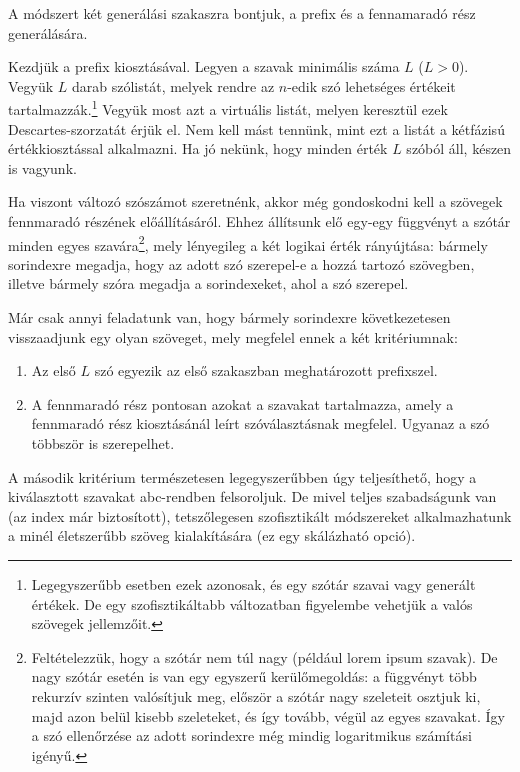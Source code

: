 \documentclass[
    parspace, %
    noindent, %
]{elteiktdk}[2023/04/10]
\begin{document}
A módszert két generálási szakaszra bontjuk, a prefix és a fennamaradó rész generálására.

Kezdjük a prefix kiosztásával.
Legyen a szavak minimális száma $L$ ($L > 0$).
Vegyük $L$ darab szólistát, melyek rendre az $n$-edik szó lehetséges értékeit tartalmazzák.\footnote{
  Legegyszerűbb esetben ezek azonosak, és egy szótár szavai vagy generált értékek.
  De egy szofisztikáltabb változatban figyelembe vehetjük a valós szövegek jellemzőit.
}
Vegyük most azt a virtuális listát, melyen keresztül ezek Descartes-szorzatát érjük el.
Nem kell mást tennünk, mint ezt a listát a kétfázisú értékkiosztással alkalmazni.
Ha jó nekünk, hogy minden érték $L$ szóból áll, készen is vagyunk.

Ha viszont változó szószámot szeretnénk,
akkor még gondoskodni kell a szövegek fennmaradó részének előállításáról.
Ehhez állítsunk elő egy-egy függvényt a szótár minden egyes szavára\footnote{
  Feltételezzük, hogy a szótár nem túl nagy (például lorem ipsum szavak).
  De nagy szótár esetén is van egy egyszerű kerülőmegoldás:
  a függvényt több rekurzív szinten valósítjuk meg,
  először a szótár nagy szeleteit osztjuk ki,
  majd azon belül kisebb szeleteket, és így tovább, végül az egyes szavakat.
  Így a szó ellenőrzése az adott sorindexre még mindig logaritmikus számítási igényű.
}, mely lényegileg a két logikai érték rányújtása:
bármely sorindexre megadja, hogy az adott szó szerepel-e a hozzá tartozó szövegben,
illetve bármely szóra megadja a sorindexeket, ahol a szó szerepel.

Már csak annyi feladatunk van, hogy bármely sorindexre következetesen visszaadjunk egy olyan szöveget,
mely megfelel ennek a két kritériumnak:

\begin{enumerate}
  \item Az első $L$ szó egyezik az első szakaszban meghatározott prefixszel.
  \item A fennmaradó rész pontosan azokat a szavakat tartalmazza,
        amely a fennmaradó rész kiosztásánál leírt szóválasztásnak megfelel.
        Ugyanaz a szó többször is szerepelhet.
\end{enumerate}

A második kritérium természetesen legegyszerűbben úgy teljesíthető,
hogy a kiválasztott szavakat abc-rendben felsoroljuk.
De mivel teljes szabadságunk van (az index már biztosított),
tetszőlegesen szofisztikált módszereket alkalmazhatunk a minél életszerűbb szöveg kialakítására
(ez egy skálázható opció).
\end{document}
